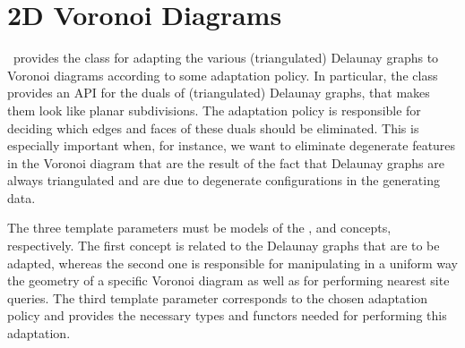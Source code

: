 

\chapter{2D Voronoi Diagrams}
\label{ref-chapter-vda2}


\cgal\ provides the class  for
adapting the various (triangulated) Delaunay graphs to Voronoi
diagrams according to some adaptation policy.
In particular, the class 
provides an API for the duals of (triangulated) Delaunay graphs, that
makes them look like planar subdivisions. The adaptation policy is
responsible for deciding which edges and faces of these duals should
be eliminated. This is especially important when, for instance, we
want to eliminate degenerate features in the Voronoi diagram that are
the result of the fact that Delaunay graphs are always triangulated
and are due to degenerate configurations in the generating data.

The three template parameters must be models of the
,  and
 concepts, respectively.
The first concept is related to the Delaunay graphs that are to be
adapted, whereas the second one is responsible for manipulating in a
uniform way the geometry of a specific Voronoi diagram as well as for
performing nearest site queries. 
The third template parameter corresponds to the chosen adaptation
policy and provides the necessary types and functors needed for
performing this adaptation.

\\
\\

